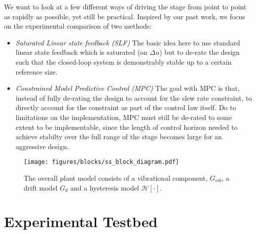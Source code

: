 \documentclass[journal,twocolumn,twoside]{IEEEtran}
\begin{document}
We want to look at a few different ways of driving the stage from point to point as rapidly as possible, yet still be practical. Inspired by our past work, we focus on the experimental comparison of two methods:
\begin{itemize}
\item\emph{Saturated Linear state feedback (SLF)} The basic idea here to use standard linear state feedback which is saturated (on $\Delta u$) but to de-rate the design such that the closed-loop system is demonstrably stable up to a certain reference size. 
\item\emph{Constrained Model Predictive Control (MPC)} The goal with MPC is that, instead of fully de-rating the design to account for the slew rate constraint, to directly account for the constraint as part of the control law itself. Do to limitations on the implementation, MPC must still be de-rated to some extent to be implementable, since the length of control horizon needed to achieve stabilty over the full range of the stage becomes large for an aggressive design.
\end{itemize}


\begin{figure*}
  \centering  
  \texttt{[image: figures/blocks/ss\_block\_diagram.pdf]}
  \caption{The overall plant model consists of a vibrational component, $G_{vib}$, a drift model $G_{d}$ and a hysteresis model $\mathcal{H}[\cdot]$. }
  \label{fig:ss_bd}
\end{figure*}

\section{Experimental Testbed}\label{sec:testbed}
  
\end{document}
